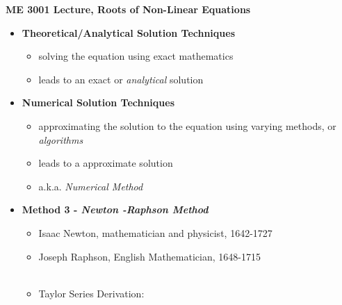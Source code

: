\documentclass[11pt]{article}
\begin{document}
\textbf{ \LARGE ME 3001 Lecture, Roots of Non-Linear Equations} \\

\begin{itemize}


	\item \textbf{ \LARGE Theoretical/Analytical Solution Techniques }
			\begin{itemize}
				\item \LARGE{solving the equation using exact mathematics} \\
				\item \LARGE{leads to an exact or {\it analytical} solution} \\ \vspace{40mm}
				
			\end{itemize}
	\item \textbf{ \LARGE Numerical Solution Techniques }		
			\begin{itemize}
				\item \LARGE{ approximating the solution to the equation using varying methods, or {\it algorithms} } \\
				\item \LARGE{leads to a approximate solution} \\ 
				\item \LARGE{a.k.a. {\it Numerical Method}}\vspace{20mm}
			\end{itemize}
\newpage

	\item \textbf{ \LARGE Method 3 - {\it Newton -Raphson Method}}
		\begin{itemize}
			\item \LARGE{Isaac Newton, mathematician and physicist, 1642-1727}
			\item \LARGE{Joseph Raphson, English Mathematician, 1648-1715} \\\\
			\item \LARGE{Taylor Series Derivation:} \\
		

				 \vspace{50mm}
		
\newpage


\end{itemize}
\end{itemize}
\end{document}
